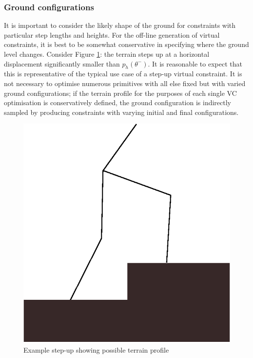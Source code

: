 \subsubsection{Ground configurations} \label{sec:ground}
It is important to consider the likely shape of the ground for constraints with particular step lengths and heights. For the off-line generation of virtual constraints, it is best to be somewhat conservative in specifying where the ground level changes. Consider Figure \ref{fig:stepup}: the terrain steps up at a horizontal displacement significantly smaller than $p_h(\theta^-)$. It is reasonable to expect that this is representative of the typical use case of a step-up virtual constraint. It is not necessary to optimise numerous primitives with all else fixed but with varied ground configurations; if the terrain profile for the purposes of each single VC optimisation is conservatively defined, the ground configuration is indirectly sampled by producing constraints with varying initial and final configurations.

\begin{figure}
	\centering
	\includegraphics[width=0.4\linewidth]{4VirtConstLib/stepup.eps}
	\caption{Example step-up showing possible terrain profile}
	\label{fig:stepup}
\end{figure}

